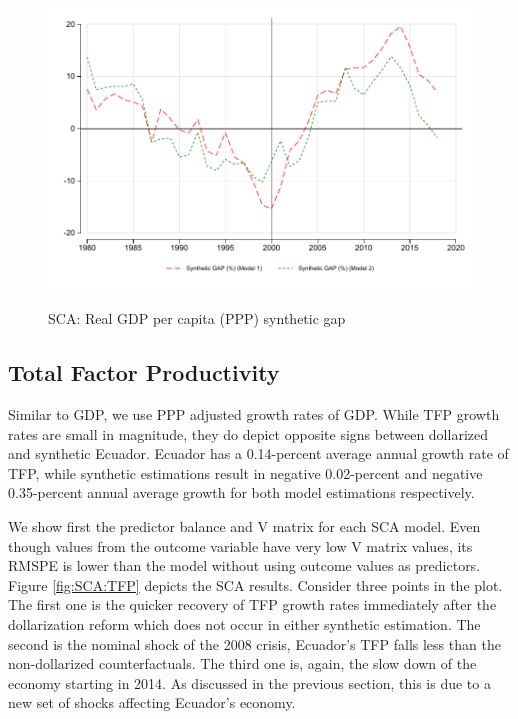 \documentclass[12pt]{article}
\begin{document}
\begin{figure}[!h]
    \caption{SCA: Real GDP per capita (PPP) synthetic gap}
    \centering
    \includegraphics{STATA/Fig_GDP_GAP.pdf}
    \label{fig:SCA_gap}
\end{figure}

\subsection{Total Factor Productivity}

Similar to GDP, we use PPP adjusted growth rates of GDP. While TFP growth rates are small in magnitude, they do depict opposite signs between dollarized and synthetic Ecuador. Ecuador has a 0.14-percent average annual growth rate of TFP, while synthetic estimations result in  negative 0.02-percent and negative 0.35-percent annual average growth for both model estimations respectively. 

We show first the predictor balance and V matrix for each SCA model. Even though values from the outcome variable have very low V matrix values, its RMSPE is lower than the model without using outcome values as predictors. Figure \ref{fig:SCA:TFP} depicts the SCA results. Consider three points in the plot. The first one is the quicker recovery of TFP growth rates immediately after the dollarization reform which does not occur in either synthetic estimation. The second is the nominal shock of the 2008 crisis, Ecuador's TFP falls less than the non-dollarized counterfactuals. The third one is, again, the slow down of the economy starting in 2014. As discussed in the previous section, this is due to a new set of shocks affecting Ecuador's economy.


\end{document}
